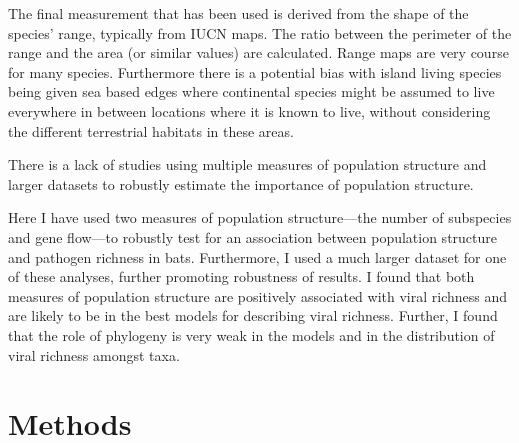
The final measurement that has been used is derived from the shape of the species' range, typically from IUCN \cite{iucn} maps.
The ratio between the perimeter of the range and the area (or similar values) are calculated.
Range maps are very course for many species.
Furthermore there is a potential bias with island living species being given sea based edges where continental species might be assumed to live everywhere in between locations where it is known to live, without considering the different terrestrial habitats in these areas.


There is a lack of studies using multiple measures of population structure and larger datasets to robustly estimate the importance of population structure.



Here I have used two measures of population structure---the number of subspecies and gene flow---to robustly test for an association between population structure and pathogen richness in bats.
Furthermore, I used a much larger dataset for one of these analyses, further promoting robustness of results.
I found that both measures of population structure are positively associated with viral richness and are likely to be in the best models for describing viral richness.
Further, I found that the role of phylogeny is very weak in the models and in the distribution of viral richness amongst taxa.



\section{Methods}

